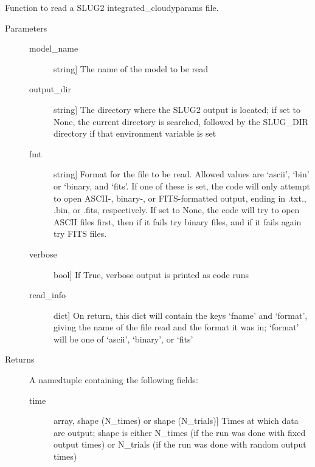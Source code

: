 \documentclass[letterpaper,10pt,english]{sphinxmanual}
\begin{document}
\begin{fulllineitems}
\label{\detokenize{cloudy:slugpy.cloudy.read_integrated_cloudyparams}}
Function to read a SLUG2 integrated\_cloudyparams file.
\begin{description}
\item[{Parameters}] \leavevmode\begin{description}
\item[{model\_name}] \leavevmode{[}string{]}
The name of the model to be read

\item[{output\_dir}] \leavevmode{[}string{]}
The directory where the SLUG2 output is located; if set to None,
the current directory is searched, followed by the SLUG\_DIR
directory if that environment variable is set

\item[{fmt}] \leavevmode{[}string{]}
Format for the file to be read. Allowed values are ‘ascii’,
‘bin’ or ‘binary, and ‘fits’. If one of these is set, the code
will only attempt to open ASCII-, binary-, or FITS-formatted
output, ending in .txt., .bin, or .fits, respectively. If set
to None, the code will try to open ASCII files first, then if
it fails try binary files, and if it fails again try FITS
files.

\item[{verbose}] \leavevmode{[}bool{]}
If True, verbose output is printed as code runs

\item[{read\_info}] \leavevmode{[}dict{]}
On return, this dict will contain the keys ‘fname’ and
‘format’, giving the name of the file read and the format it
was in; ‘format’ will be one of ‘ascii’, ‘binary’, or ‘fits’

\end{description}

\item[{Returns}] \leavevmode
A namedtuple containing the following fields:
\begin{description}
\item[{time}] \leavevmode{[}array, shape (N\_times) or shape (N\_trials){]}
Times at which data are output; shape is either N\_times (if
the run was done with fixed output times) or N\_trials (if
the run was done with random output times)


\end{description}
\end{description}
\end{fulllineitems}
\end{document}
